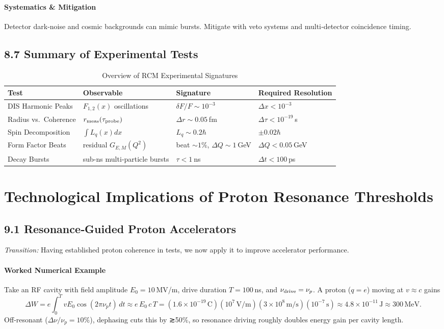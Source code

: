 \paragraph{Systematics \& Mitigation}  
Detector dark‐noise and cosmic backgrounds can mimic bursts.  Mitigate with veto systems and multi‐detector coincidence timing.

\subsection{8.7 Summary of Experimental Tests}
\begin{table}[ht]
  \centering
  \caption{Overview of RCM Experimental Signatures}
  \label{tab:exp_summary}
  \begin{tabular}{@{}llll@{}}
    \toprule
    Test                 & Observable                   & Signature                  & Required Resolution \\
    \midrule
    DIS Harmonic Peaks   & \(F_{1,2}(x)\) oscillations  & \(\delta F/F\sim10^{-3}\)  & \(\Delta x<10^{-3}\)\\
    Radius vs.\ Coherence& \(r_{\rm meas}(\tau_{\rm probe})\) & \(\Delta r\sim0.05\) fm & \(\Delta\tau<10^{-19}\) s \\
    Spin Decomposition   & \(\int L_q(x)dx\)            & \(L_q\sim0.2\hbar\)       & \(\pm0.02\hbar\)   \\
    Form Factor Beats    & residual \(G_{E,M}(Q^2)\)   & beat \(\sim1\%\), \(\Delta Q\sim1\) GeV & \(\Delta Q<0.05\) GeV \\
    Decay Bursts         & sub-ns multi‐particle bursts & \(\tau<1\) ns             & \(\Delta t<100\) ps \\
    \bottomrule
  \end{tabular}
\end{table}

\section{Technological Implications of Proton Resonance Thresholds}

\subsection{9.1 Resonance‐Guided Proton Accelerators}
\emph{Transition:} Having established proton coherence in tests, we now apply it to improve accelerator performance.

\paragraph{Worked Numerical Example}  
Take an RF cavity with field amplitude \(E_0 = 10\) MV/m, drive duration \(T=100\) ns, and \(\nu_{\rm drive}=\nu_p\).  A proton (\(q=e\)) moving at \(v\approx c\) gains
\[
\Delta W
= e\int_0^T vE_0\cos(2\pi\nu_p t)\,dt
\approx e\,E_0\,c\,T
= (1.6\times10^{-19}\,\mathrm{C})(10^7\,\mathrm{V/m})(3\times10^8\,\mathrm{m/s})(10^{-7}\,\mathrm{s})
\approx 4.8\times10^{-11}\,\mathrm{J}\approx300\,\mathrm{MeV}.
\]
Off‐resonant (\(\Delta\nu/\nu_p=10\%\)), dephasing cuts this by ≳50\%, so resonance driving roughly doubles energy gain per cavity length.

